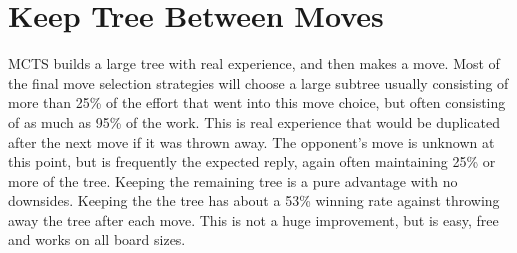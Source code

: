 

\section{Keep Tree Between Moves}

MCTS builds a large tree with real experience, and then makes a move. Most of the final move selection strategies will choose a large subtree usually consisting of more than 25\% of the effort that went into this move choice, but often consisting of as much as 95\% of the work. This is real experience that would be duplicated after the next move if it was thrown away. The opponent's move is unknown at this point, but is frequently the expected reply, again often maintaining 25\% or more of the tree. Keeping the remaining tree is a pure advantage with no downsides. Keeping the the tree has about a 53\% winning rate against throwing away the tree after each move. This is not a huge improvement, but is easy, free and works on all board sizes.

